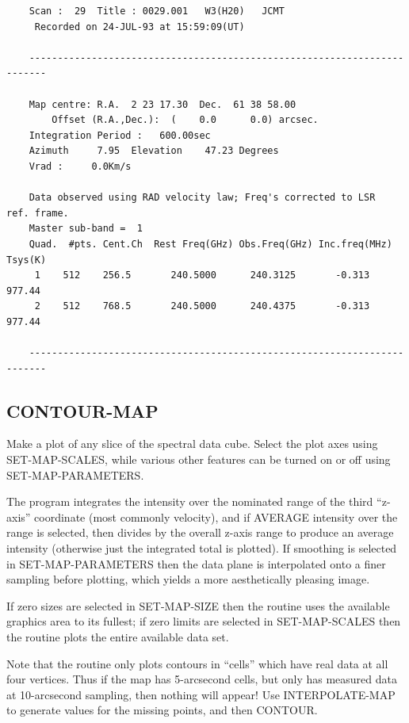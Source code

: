 \documentclass[11pt,twoside]{report}
\begin{document}
\begin{verbatim}
    Scan :  29  Title : 0029.001   W3(H20)   JCMT 
     Recorded on 24-JUL-93 at 15:59:09(UT)
 
    -------------------------------------------------------------------------

    Map centre: R.A.  2 23 17.30  Dec.  61 38 58.00
        Offset (R.A.,Dec.):  (    0.0      0.0) arcsec.
    Integration Period :   600.00sec
    Azimuth     7.95  Elevation    47.23 Degrees
    Vrad :     0.0Km/s

    Data observed using RAD velocity law; Freq's corrected to LSR  ref. frame.
    Master sub-band =  1
    Quad.  #pts. Cent.Ch  Rest Freq(GHz) Obs.Freq(GHz) Inc.freq(MHz) Tsys(K)
     1    512    256.5       240.5000      240.3125       -0.313    977.44    
     2    512    768.5       240.5000      240.4375       -0.313    977.44    

    -------------------------------------------------------------------------
\end{verbatim}

\subsection{CONTOUR-MAP} 

Make a plot of any slice  of the spectral data cube.
Select the plot axes using SET-MAP-SCALES, while various other features can be
turned on or off using SET-MAP-PARAMETERS. 

The program integrates the intensity over the nominated range of the third
``z-axis'' coordinate (most commonly velocity), and if AVERAGE intensity
over the range is selected, then divides by the overall z-axis range to 
produce an average intensity (otherwise just the integrated total is plotted).
If smoothing is selected in SET-MAP-PARAMETERS then the data plane is
interpolated  onto a finer sampling before plotting,
which yields a more aesthetically pleasing image. 

If zero sizes are selected in SET-MAP-SIZE then the routine uses the
available graphics area to its fullest; if zero limits are selected in
SET-MAP-SCALES then the routine plots the entire available data set.

Note that the routine only plots contours in ``cells'' which have real
data at all four vertices. Thus if the map has 5-arcsecond cells, but only
has measured data at 10-arcsecond sampling, then nothing will appear! Use
INTERPOLATE-MAP to generate values for the missing points, and then CONTOUR.
\end{document}
